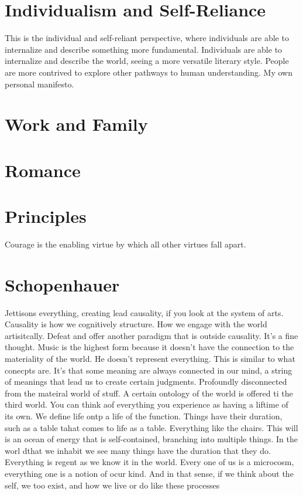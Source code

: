 \documentclass[12pt,letterpaper]{article}
\begin{document}
\section{Individualism and Self-Reliance}
This is the individual and self-reliant perspective, where individuals are able to internalize and describe something more fundamental.  Individuals are able to internalize and describe the world, seeing a more versatile literary style.  People are more contrived to explore other pathways to human understanding.  My own personal manifesto.

\section{Work and Family}

\section{Romance}

\section{Principles}
Courage is the enabling virtue by which all other virtues fall apart. 

\section{Schopenhauer}
Jettisons everything, creating lead causality,  if you look  at the system of arts.  Causality is how we cognitively structure.  How we engage with the world artisitcally.  Defeat and offer another paradigm that is outside causality.  It's a fine thought.  Music is the highest form because it doesn't have the connection to the materiality of the world.  He doesn't represent everything.  This is similar to what conecpts are.  It's that some meaning are always connected in our mind, a string of meanings that lead us to create certain judgments.  Profoundly disconnected from the mateiral world of stuff.  A certain ontology of the world is offered ti the third world.  You can think aof everything you experience as having a liftime of its own.  We define life ontp a life of the function.  Things have their duration, such as a table tahat comes to life as a table.  Everything like the chairs.  This will is an ocean of energy that is self-contained, branching into multiple things.  In the worl dthat we inhabit we see many things have the duration that they do.  Everything is regent as we know it in the world.  Every one of us is a microcosm, everything one is a notion of ocur kind.  And in that sense, if we think about the self, we too exist, and how we live or do like these processes
\end{document}
